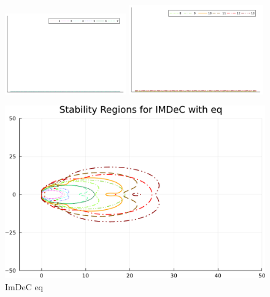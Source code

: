 \begin{figure}
	\centering
	\includegraphics[width=0.465\textwidth,trim={215 340 32 22}, clip]{pdf/odepics/colors_a-d_new_horiz_2-7_no_order.pdf}\!\!
	\includegraphics[width=0.515\textwidth,trim={179 340 30 22}, clip]{pdf/odepics/colors_a-d_new_horiz_8-13_no_order.pdf}\\
	\begin{minipage}[t]{0.32\textwidth}
		\centering
		\includegraphics[width=\textwidth, trim={0 0 0 0}, clip]{pdf/odepics/IMDeC_eq_ord13-crop.pdf}\\
		ImDeC eq
	\end{minipage}
	\begin{minipage}[t]{0.32\textwidth}
		\centering

\end{minipage}
\end{figure}
